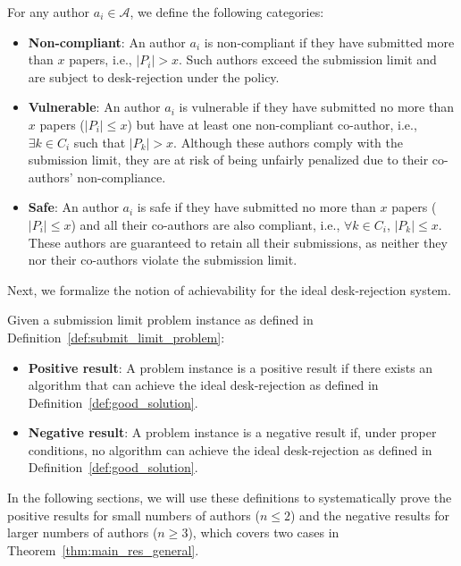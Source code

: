 \begin{definition}\label{def:three_kinds_authors}
For any author $a_i \in \mathcal{A}$, we define the following categories:
\begin{itemize}
    \item \textbf{Non-compliant}: An author $a_i$ is non-compliant if they have submitted more than $x$ papers, i.e., $|P_i| > x$. Such authors exceed the submission limit and are subject to desk-rejection under the policy.

    \item \textbf{Vulnerable}: An author $a_i$ is vulnerable if they have submitted no more than $x$ papers ($|P_i| \leq x$) but have at least one non-compliant co-author, i.e., $\exists k \in C_i$ such that $|P_k| > x$. Although these authors comply with the submission limit, they are at risk of being unfairly penalized due to their co-authors' non-compliance.

    \item \textbf{Safe}: An author $a_i$ is safe if they have submitted no more than $x$ papers ($|P_i| \leq x$) and all their co-authors are also compliant, i.e., $\forall k \in C_i$, $|P_k| \leq x$. These authors are guaranteed to retain all their submissions, as neither they nor their co-authors violate the submission limit.
\end{itemize}
\end{definition}

Next, we formalize the notion of achievability for the ideal desk-rejection system.

\begin{definition}[Achievability]\label{def:achievability}
Given a submission limit problem instance as defined in Definition~\ref{def:submit_limit_problem}:
\begin{itemize}
    \item \textbf{Positive result}: A problem instance is a positive result if there exists an algorithm that can achieve the ideal desk-rejection as defined in Definition~\ref{def:good_solution}.
    
    \item \textbf{Negative result}: A problem instance is a negative result if,  under proper conditions, no algorithm can achieve the ideal desk-rejection as defined in Definition~\ref{def:good_solution}.
\end{itemize}
\end{definition}

In the following sections, we will use these definitions to systematically prove the positive results for small numbers of authors ($n \leq 2$) and the negative results for larger numbers of authors ($n \geq 3$), which covers two cases in Theorem~\ref{thm:main_res_general}.


